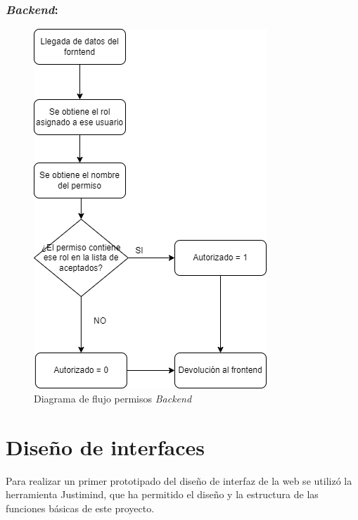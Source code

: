 \subsubsection{\textit{Backend}:}
\begin{figure}[htbp]
    \centering
    \includegraphics[width=0.5\linewidth]{Imagenes/Back permisos.png}
    \caption{Diagrama de flujo permisos \textit{Backend}}
    \label{Diagrama de flujo permisos Backend}
\end{figure}
\FloatBarrier

\section{Diseño de interfaces}
 Para realizar un primer prototipado del diseño de interfaz de la web se utilizó la herramienta Justimind, que ha permitido el diseño y la estructura de las funciones básicas de este proyecto.


